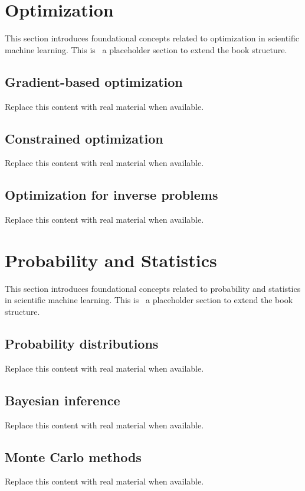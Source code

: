 \section{Optimization}
This section introduces foundational concepts related to optimization in scientific machine learning. This is~\cite{abdulmaksoudTransformerBasedSensorFusion2025} a placeholder section to extend the book structure.

\subsection{Gradient-based optimization}
Replace this content with real material when available.

\subsection{Constrained optimization}
Replace this content with real material when available.

\subsection{Optimization for inverse problems}
Replace this content with real material when available.

\section{Probability and Statistics}
This section introduces foundational concepts related to probability and statistics in scientific machine learning. This is~\cite{abdulmaksoudTransformerBasedSensorFusion2025} a placeholder section to extend the book structure.

\subsection{Probability distributions}
Replace this content with real material when available.

\subsection{Bayesian inference}
Replace this content with real material when available.

\subsection{Monte Carlo methods}
Replace this content with real material when available.

